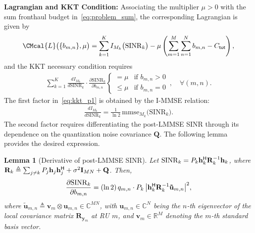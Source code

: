 \documentclass[10pt, twocolumn, comsoc]{IEEEtran}
\newtheorem{lemma}{Lemma}
\begin{document}
{\bf{Lagrangian and KKT Condition:}}
Associating the multiplier $\mu > 0$ with the sum fronthaul budget in~\eqref{eq:problem_sum}, the corresponding Lagrangian is given by 
\begin{align} \label{eq:lagrangian_p1}
  \CMcal{L}\big(\{b_{m,n}\}, \mu\big) 
  = \sum_{k=1}^{K} 
    I_{M_k}\big(\mathrm{SINR}_k\big) 
  - \mu  \left(\sum_{m=1}^{M} \sum_{n=1}^{N} 
                b_{m,n} - C_{\sf tot}\right),
\end{align}
and the KKT necessary condition requires
\begin{align} \label{eq:kkt_p1}
  \sum_{k=1}^{K} 
  \frac{d I_{M_k}}{d \mathrm{SINR}_k} 
  \cdot \frac{\partial \mathrm{SINR}_k}
              {\partial b_{m,n}} 
  \begin{cases}
       = \mu & \text{if } b_{m,n} > 0 \\
       \leq \mu & \text{if } b_{m,n} = 0
  \end{cases}\,,
  \quad \forall (m, n).
\end{align}
The first factor in~\eqref{eq:kkt_p1} is obtained by the I-MMSE relation:
\begin{align} \label{eq:immse_user}
  \frac{d I_{M_k}}{d \mathrm{SINR}_k} 
  = \frac{1}{\ln 2} \, 
    \mathrm{mmse}_{M_k}\big(\mathrm{SINR}_k\big).
\end{align}
The second factor requires differentiating the 
post-LMMSE SINR through its dependence on the 
quantization noise covariance $\mathbf{Q}$. 
The following lemma provides the desired expression.

\begin{lemma}[Derivative of post-LMMSE SINR]
\label{lem:dsinr}
Let $\mathrm{SINR}_k = P_k \mathbf{h}_k^{\sf H} 
\mathbf{R}_k^{-1} \mathbf{h}_k$, where $\mathbf{R}_k \triangleq \sum_{j \neq k} P_j \mathbf{h}_j \mathbf{h}_j^{\sf H} + \sigma^2 \mathbf{I}_{MN} + \mathbf{Q}$. 
Then,
\begin{align} \label{eq:dsinr}
  \frac{\partial \mathrm{SINR}_k}{\partial b_{m,n}} 
  = (\ln 2) \, q_{m,n} \cdot P_k \, 
    \big|\mathbf{h}_k^{\sf H} \mathbf{R}_k^{-1} 
         \mathbf{\tilde u}_{m,n}\big|^2,
\end{align}
where $\mathbf{\tilde u}_{m,n} \triangleq \mathbf{v}_m \otimes \mathbf{u}_{m,n} \in \mathbb{C}^{MN}$, with $\mathbf{u}_{m,n} \in \mathbb{C}^N$ being the $n$-th eigenvector of the local covariance matrix $\mathbf{R}_{\mathbf{y}_m}$ at RU $m$, and $\mathbf{v}_m \in \mathbb{R}^M$ denoting the $m$-th standard basis vector.
\end{lemma}
\end{document}
